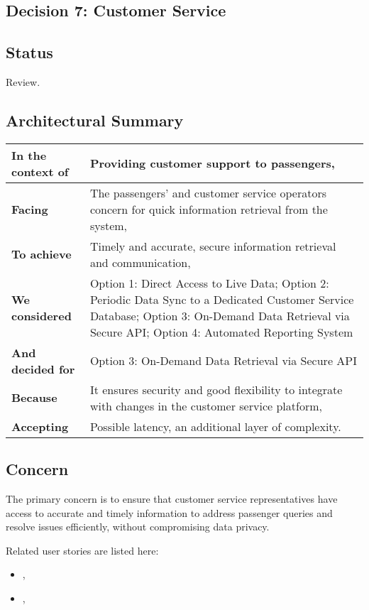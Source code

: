 \subsection{Decision 7: Customer Service}

\subsection*{Status}
Review.

\subsection*{Architectural Summary}
\begin{tabular}{|p{3.5cm}|p{10.5cm}|}
    \hline
    \textbf{In the context of} & Providing customer support to passengers, \\
    \hline
    \textbf{Facing} & The passengers' and customer service operators concern for quick information retrieval from the system, \\
    \hline
    \textbf{To achieve} & Timely and accurate, secure information retrieval and communication, \\
    \hline
    \textbf{We considered} & Option 1: Direct Access to Live Data; Option 2: Periodic Data Sync to a Dedicated Customer Service Database; Option 3: On-Demand Data Retrieval via Secure API; Option 4: Automated Reporting System\\
    \hline
    \textbf{And decided for} & Option 3: On-Demand Data Retrieval via Secure API \\
    \hline
    \textbf{Because} & It ensures security and good flexibility to integrate with changes in the customer service platform, \\
    \hline
    \textbf{Accepting} & Possible latency, an additional layer of complexity. \\
    \hline
\end{tabular}

\subsection*{Concern}
The primary concern is to ensure that customer service representatives have access to accurate and timely information to address passenger queries and resolve issues efficiently, without compromising data privacy.

Related user stories are listed here:
\begin{itemize}
    \item \userStoryEighteen,
    \item \userStoryTwentySix,
\end{itemize}


